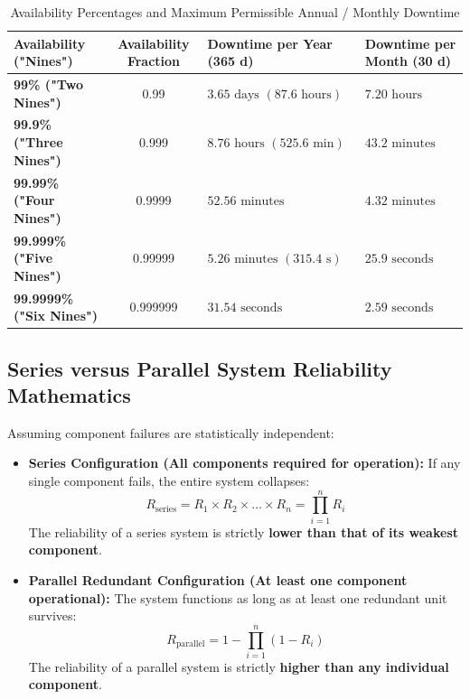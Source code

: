 \begin{table}[htbp]
\centering
\small
\caption{Availability Percentages and Maximum Permissible Annual / Monthly Downtime}
\label{tab:table_of_nines}
\begin{tabularx}{\textwidth}{l c >{\centering\arraybackslash}X >{\centering\arraybackslash}X}
\toprule
\textbf{Availability ("Nines")} & \textbf{Availability Fraction} & \textbf{Downtime per Year (365 d)} & \textbf{Downtime per Month (30 d)} \\
\midrule
\textbf{99\% ("Two Nines")} & 0.99 & $3.65\text{ days } (87.6\text{ hours})$ & $7.20\text{ hours}$ \\
\textbf{99.9\% ("Three Nines")} & 0.999 & $8.76\text{ hours } (525.6\text{ min})$ & $43.2\text{ minutes}$ \\
\textbf{99.99\% ("Four Nines")} & 0.9999 & $52.56\text{ minutes}$ & $4.32\text{ minutes}$ \\
\textbf{99.999\% ("Five Nines")} & 0.99999 & $5.26\text{ minutes } (315.4\text{ s})$ & $25.9\text{ seconds}$ \\
\textbf{99.9999\% ("Six Nines")} & 0.999999 & $31.54\text{ seconds}$ & $2.59\text{ seconds}$ \\
\bottomrule
\end{tabularx}
\end{table}

\subsection{Series versus Parallel System Reliability Mathematics}
Assuming component failures are statistically independent:
\begin{itemize}
    \item \textbf{Series Configuration (All components required for operation):}
    If any single component fails, the entire system collapses:
    \begin{equation}
    \boxed{R_{\text{series}} = R_1 \times R_2 \times \dots \times R_n = \prod_{i=1}^{n} R_i}
    \end{equation}
    The reliability of a series system is strictly \textbf{lower than that of its weakest component}.
    \item \textbf{Parallel Redundant Configuration (At least one component operational):}
    The system functions as long as at least one redundant unit survives:
    \begin{equation}
    \boxed{R_{\text{parallel}} = 1 - \prod_{i=1}^{n} (1 - R_i)}
    \end{equation}
    The reliability of a parallel system is strictly \textbf{higher than any individual component}.
\end{itemize}

